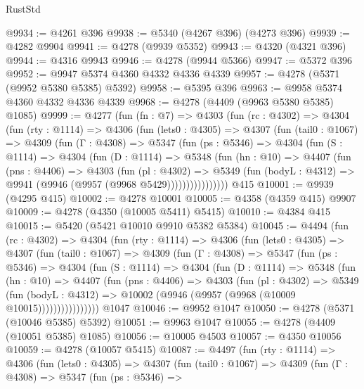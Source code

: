 \begin{lexlean}{RustStd}
\begin{coremodule}
@9934 := @4261 @396
@9938 := @5340 (@4267 @396) (@4273 @396)
@9939 := @4282 @9904
@9941 := @4278 (@9939 @5352)
@9943 := @4320 (@4321 @396)
@9944 := @4316 @9943
@9946 := @4278 (@9944 @5366)
@9947 := @5372 @396
@9952 := @9947 @5374 @4360 @4332 @4336 @4339
@9957 := @4278 (@5371 (@9952 @5380 @5385) @5392)
@9958 := @5395 @396
@9963 := @9958 @5374 @4360 @4332 @4336 @4339
@9968 := @4278 (@4409 (@9963 @5380 @5385) @1085)
@9999 := @4277
    (fun (fn : @7) =>
    @4303
      (fun (rc : @4302) =>
      @4304
        (fun (rty : @1114) =>
        @4306
          (fun (lets0 : @4305) =>
          @4307
            (fun (tail0 : @1067) =>
            @4309
              (fun (Γ : @4308) =>
              @5347
                (fun (ps : @5346) =>
                @4304
                  (fun (S : @1114) =>
                  @4304
                    (fun (D : @1114) =>
                    @5348
                      (fun (hn : @10) =>
                      @4407
                        (fun (pns : @4406) =>
                        @4303
                          (fun (pl : @4302) =>
                          @5349
                            (fun (bodyL : @4312) => @9941 (@9946 (@9957 (@9968 @5429))))))))))))))))
    @415
@10001 := @9939 (@4295 @415)
@10002 := @4278 @10001
@10005 := @4358 (@4359 @415) @9907
@10009 := @4278 (@4350 (@10005 @5411) @5415)
@10010 := @4384 @415
@10015 := @5420 (@5421 @10010 @9910 @5382 @5384)
@10045 := @4494
    (fun (rc : @4302) =>
    @4304
      (fun (rty : @1114) =>
      @4306
        (fun (lets0 : @4305) =>
        @4307
          (fun (tail0 : @1067) =>
          @4309
            (fun (Γ : @4308) =>
            @5347
              (fun (ps : @5346) =>
              @4304
                (fun (S : @1114) =>
                @4304
                  (fun (D : @1114) =>
                  @5348
                    (fun (hn : @10) =>
                    @4407
                      (fun (pns : @4406) =>
                      @4303
                        (fun (pl : @4302) =>
                        @5349
                          (fun (bodyL : @4312) =>
                          @10002 (@9946 (@9957 (@9968 (@10009 @10015))))))))))))))))
    @1047
@10046 := @9952 @1047
@10050 := @4278 (@5371 (@10046 @5385) @5392)
@10051 := @9963 @1047
@10055 := @4278 (@4409 (@10051 @5385) @1085)
@10056 := @10005 @4503
@10057 := @4350 @10056
@10059 := @4278 (@10057 @5415)
@10087 := @4497
    (fun (rty : @1114) =>
    @4306
      (fun (lets0 : @4305) =>
      @4307
        (fun (tail0 : @1067) =>
        @4309
          (fun (Γ : @4308) =>
          @5347
            (fun (ps : @5346) =>

\end{coremodule}
\end{lexlean}
